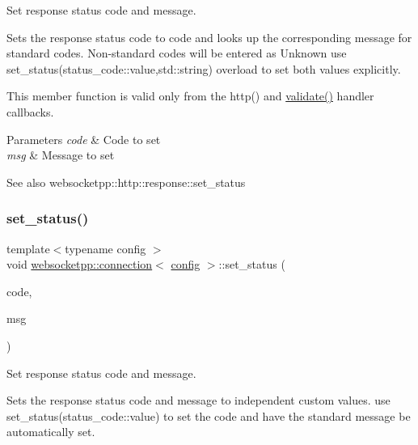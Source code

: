 Set response status code and message. 

Sets the response status code to {\ttfamily code} and looks up the corresponding message for standard codes. Non-\/standard codes will be entered as Unknown use set\+\_\+status(status\+\_\+code\+::value,std\+::string) overload to set both values explicitly.

This member function is valid only from the http() and \mbox{\hyperlink{authority_8hpp_a98696231ed7d6f1c166797053cebc5eb}{validate()}} handler callbacks.


\begin{DoxyParams}{Parameters}
{\em code} & Code to set \\
\hline
{\em msg} & Message to set \\
\hline
\end{DoxyParams}
\begin{DoxySeeAlso}{See also}
websocketpp\+::http\+::response\+::set\+\_\+status 
\end{DoxySeeAlso}
\mbox{\label{classwebsocketpp_1_1connection_a97b4513339167df8653a11ef3ccc65b1}} 
\subsubsection{\texorpdfstring{set\+\_\+status()}{set\_status()}\hspace{0.1cm}{\footnotesize\ttfamily [2/2]}}
{\footnotesize\ttfamily template$<$typename config $>$ \\
void \mbox{\hyperlink{classwebsocketpp_1_1connection}{websocketpp\+::connection}}$<$ \mbox{\hyperlink{classconfig}{config}} $>$\+::set\+\_\+status (\begin{DoxyParamCaption}\item[{http\+::status\+\_\+code\+::value}]{code,  }\item[{std\+::string const \&}]{msg }\end{DoxyParamCaption})}



Set response status code and message. 

Sets the response status code and message to independent custom values. use set\+\_\+status(status\+\_\+code\+::value) to set the code and have the standard message be automatically set.

